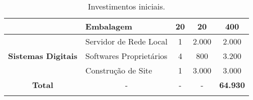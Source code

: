\begin{table}[h]
{\begin{tabular}{clccc}
		\multicolumn{1}{|c|}{}                                                                                                      & \multicolumn{1}{l|}{Embalagem}                & \multicolumn{1}{c|}{20}                  & \multicolumn{1}{c|}{20}                                                                      & \multicolumn{1}{c|}{400}                                                                  \\ \hline
		\multicolumn{1}{|c|}{\multirow{3}{*}{\textbf{Sistemas Digitais}}}                                                           & \multicolumn{1}{l|}{Servidor de Rede Local}   & \multicolumn{1}{c|}{1}                   & \multicolumn{1}{c|}{2.000}                                                                   & \multicolumn{1}{c|}{2.000}                                                                \\ \cline{2-5} 
		\multicolumn{1}{|c|}{}                                                                                                      & \multicolumn{1}{l|}{Softwares Proprietários}  & \multicolumn{1}{c|}{4}                   & \multicolumn{1}{c|}{800}                                                                     & \multicolumn{1}{c|}{3.200}                                                                \\ \cline{2-5} 
		\multicolumn{1}{|c|}{}                                                                                                      & \multicolumn{1}{l|}{Construção de Site}       & \multicolumn{1}{c|}{1}                   & \multicolumn{1}{c|}{3.000}                                                                   & \multicolumn{1}{c|}{3.000}                                                                \\ \hline
		\multicolumn{1}{|c|}{\textbf{Total}}                                                                                        & \multicolumn{1}{c|}{-}                        & \multicolumn{1}{c|}{-}                   & \multicolumn{1}{c|}{-}                                                                       & \multicolumn{1}{c|}{\textbf{64.930}}                                                                     \\ \hline
		\multicolumn{1}{l}{}                                                                                                        &                                               & \multicolumn{1}{l}{}                     & \multicolumn{1}{l}{}                                                                         & \multicolumn{1}{l}{}                                                                     
	\end{tabular}
}
\caption{Investimentos iniciais.}
\label{investimentosiniciais}
\end{table}

